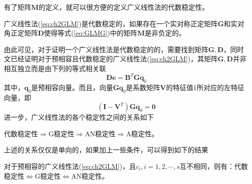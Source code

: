有了矩阵$\bm{M}$的定义，就可以很方便的定义广义线性法的代数稳定性。
\begin{definition}[代数稳定性]
广义线性法(\ref{eq:ch2GLM})是代数稳定的\cite{Jackiewicz2009a}，如果存在一个实对称正定矩阵$\bm{G}$和实对角正定矩阵$\bm{D}$使得等式(\ref{eq:GLMG})中的矩阵$\bm{M}$是非负定的。
\end{definition}

由此可见，对于证明一个广义线性法是代数稳定的的，需要找到矩阵$\bm{G,D}$，同时文已经证明对于预相容且代数稳定的广义线性法(\ref{eq:ch2GLM})，其矩阵$\bm{G},\bm{D}$并非相互独立而是由下列的等式相关联
\begin{equation}
\bm{De}=\bm{B}^T\bm{Gq}_0
\end{equation}
其中，$\bm{q}_0$是预相容向量。而且，向量$\bm{Gq}_0$是系数矩阵$\bm{V}$的特征值1所对应的左特征向量，即
\begin{equation}
(\bm{I}-\bm{V}^T)\bm{Gq}_0=\bm{0}
\end{equation}
进一步，广义线性法的各个稳定性之间的关系如下

代数稳定性$\Longrightarrow$G稳定性$\Longrightarrow$AN稳定性$\Longrightarrow$A稳定性。

上述的关系仅仅是单向的，如果加上一些条件，可以得到如下的结果
\begin{theorem}
对于预相容的广义线性法(\ref{eq:ch2GLM})，且$c_i,i=1,2,\cdots,s$互不相同，则有：代数稳定性$\iff$G稳定性$\iff$AN稳定性。
\end{theorem}


